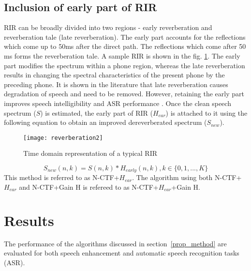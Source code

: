 \subsection{Inclusion of early part of RIR}\label{ssec:Hear_RIR}
RIR can be broadly divided into two regions - early reverberation and reverberation tale (late reverberation). The early part accounts for the reflections which come up to 50ms after the direct path. The reflections which come after 50 ms forms the reverberation tale. A sample RIR is shown in the fig. \ref{fig:RIR_plot}. The early part modifies the spectrum within a phone region, whereas the late reverberation results in changing the spectral characteristics of the present phone by the preceding phone. It is shown in the literature that late reverberation causes degradation of speech and need to be removed. However, retaining the early part improves speech intelligibility and ASR performance \cite{naylor2010speech}\cite{delcroix2014linear}. Once the clean 
speech spectrum ($S$) is estimated, the early part of RIR ($H_{ear}$) is attached to it using the following equation to obtain an improved dereverberated spectrum ($S_{new}$). 
\begin{figure}
\centering
\texttt{[image: reverberation2]}
\caption{Time domain representation of a typical RIR~\cite{rir_plot}}
\label{fig:RIR_plot}

\end{figure}
\begin{equation}
S_{new}(n,k) = S(n,k)*H_{early}(n,k), k\in\{0,1,...,K\}
\end{equation}
This method is referred to as N-CTF+$H_{ear}$. The algorithm using both N-CTF+$H_{ear}$ and N-CTF+Gain H is refereed to as N-CTF+$H_{ear}$+Gain H.
%

\section{Results}
The performance of the algorithms discussed in section~\ref{prop_method} are evaluated for both speech enhancement and automatic speech recognition tasks (ASR).
